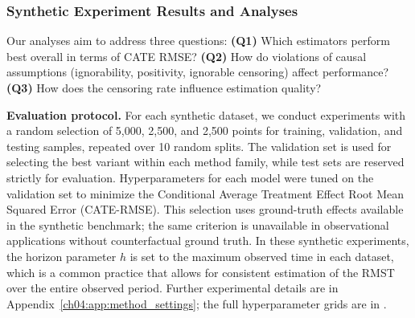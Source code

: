 \subsubsection{Synthetic Experiment Results and Analyses}\label{ch04:sec:synth_results}

Our analyses aim to address three questions:
\textbf{(Q1)} Which estimators perform best overall in terms of CATE RMSE?
\textbf{(Q2)} How do violations of causal assumptions (ignorability, positivity, ignorable censoring) affect performance?  
\textbf{(Q3)} How does the censoring rate influence estimation quality?  



\textbf{Evaluation protocol.}
For each synthetic dataset, we conduct experiments with a random selection of 5,000, 2,500, and 2,500 points for training, validation, and testing samples, repeated over 10 random splits.
The validation set is used for selecting the best variant within each method family, while test sets are reserved strictly for evaluation.
Hyperparameters for each model were tuned on the validation set to minimize the Conditional Average Treatment Effect Root Mean Squared Error (CATE-RMSE).
This selection uses ground-truth effects available in the synthetic benchmark; the same criterion is unavailable in observational applications without counterfactual ground truth.
In these synthetic experiments, the horizon parameter $h$ is set to the maximum observed time in each dataset, which is a common practice that allows for consistent estimation of the RMST over the entire observed period.
Further experimental details are in Appendix~\ref{ch04:app:method_settings}; the full hyperparameter grids are in \citet[Appendix E, Tables 9--12]{noroozizadeh2026survhte}.

